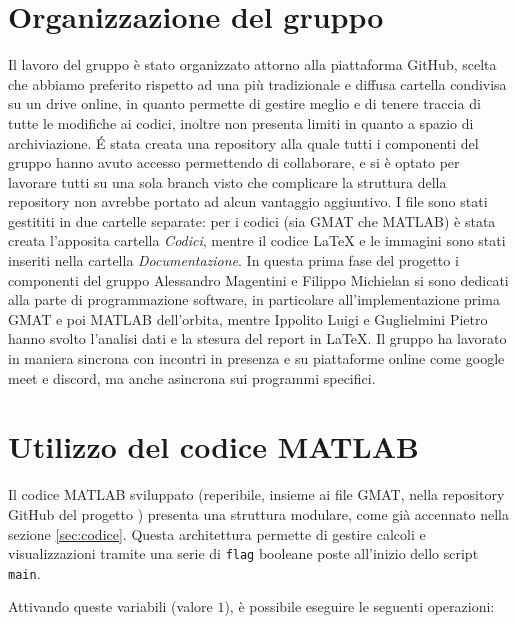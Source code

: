 \documentclass[12pt, a4paper]{article}
\begin{document}
\section{Organizzazione del gruppo}
Il lavoro del gruppo è stato organizzato attorno alla piattaforma GitHub, scelta che abbiamo preferito rispetto ad una più tradizionale e diffusa cartella condivisa su un drive online, in quanto permette di gestire meglio e di tenere traccia di tutte le modifiche ai codici, inoltre non presenta limiti in quanto a spazio di archiviazione. \'E stata creata una repository \cite{RepositoryGitHub} alla quale tutti i componenti del gruppo hanno avuto accesso permettendo di collaborare, e si è optato per lavorare tutti su una sola branch visto che complicare la struttura della repository non avrebbe portato ad alcun vantaggio aggiuntivo. 
I file sono stati gestititi in due cartelle separate: per i codici (sia GMAT che MATLAB) è stata creata l'apposita cartella \textsl{Codici}, mentre il codice LaTeX e le immagini sono stati inseriti nella cartella \textsl{Documentazione}.
In questa prima fase del progetto i componenti del gruppo Alessandro Magentini e Filippo Michielan si sono dedicati alla parte di programmazione software, in particolare all'implementazione prima GMAT e poi MATLAB dell'orbita, mentre Ippolito Luigi e Guglielmini Pietro hanno svolto l'analisi dati e la stesura del report in LaTeX. Il gruppo ha lavorato in maniera sincrona  con incontri in presenza e su piattaforme online come google meet e discord, ma anche asincrona sui programmi specifici. 
 
\newpage
\appendix 
\section{Utilizzo del codice MATLAB}
\label{sec:utilizzoCodice}
Il codice MATLAB sviluppato (reperibile, insieme ai file GMAT, nella repository GitHub del progetto \cite{RepositoryGitHub}) presenta una struttura modulare, come già accennato nella sezione \ref{sec:codice}. Questa architettura permette di gestire calcoli e visualizzazioni tramite una serie di \texttt{flag} booleane poste all'inizio dello script \texttt{main}. 

Attivando queste variabili (valore $1$), è possibile eseguire le seguenti operazioni:
\end{document}
